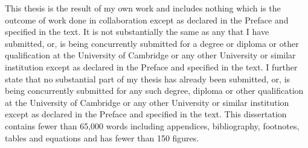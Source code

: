 
\begin{declaration}


This thesis is the result of my own work and includes nothing which is the outcome of work done in collaboration except
as declared in the Preface and specified in the text. It is not substantially the same as any that I have submitted, or,
is being concurrently submitted for a degree or diploma or other qualification at the University of Cambridge or any
other University or similar institution except as declared in the Preface and specified in the text. I further state
that no substantial part of my thesis has already been submitted, or, is being concurrently submitted for any such
degree, diploma or other qualification at the University of Cambridge or any other University or similar institution
except as declared in the Preface and specified in the text. This dissertation contains fewer than 65,000 words
including appendices, bibliography, footnotes, tables and equations and has fewer than 150 figures.


\end{declaration}

